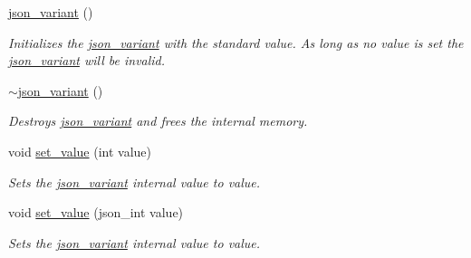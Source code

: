 \begin{DoxyCompactItemize}
\hyperlink{classJSONLIB__NAMESPACE_1_1json__variant_a846c20ca7916959fcf8768f6c5bac36d}{json\+\_\+variant} ()
\begin{DoxyCompactList}\small\item\em Initializes the \hyperlink{classJSONLIB__NAMESPACE_1_1json__variant}{json\+\_\+variant} with the standard value. As long as no value is set the \hyperlink{classJSONLIB__NAMESPACE_1_1json__variant}{json\+\_\+variant} will be invalid. \end{DoxyCompactList}\item 
\mbox{\label{classJSONLIB__NAMESPACE_1_1json__variant_acdc3fa9fc5613701852f467e695c7e10}} 
\hyperlink{classJSONLIB__NAMESPACE_1_1json__variant_acdc3fa9fc5613701852f467e695c7e10}{$\sim$json\+\_\+variant} ()
\begin{DoxyCompactList}\small\item\em Destroys \hyperlink{classJSONLIB__NAMESPACE_1_1json__variant}{json\+\_\+variant} and frees the internal memory. \end{DoxyCompactList}\item 
\mbox{\label{classJSONLIB__NAMESPACE_1_1json__variant_a0cfce194bda4d31ad37d765a6428974a}} 
void \hyperlink{classJSONLIB__NAMESPACE_1_1json__variant_a0cfce194bda4d31ad37d765a6428974a}{set\+\_\+value} (int value)
\begin{DoxyCompactList}\small\item\em Sets the \hyperlink{classJSONLIB__NAMESPACE_1_1json__variant}{json\+\_\+variant} internal value to {\ttfamily value}. \end{DoxyCompactList}\item 
\mbox{\label{classJSONLIB__NAMESPACE_1_1json__variant_abb7433858e7a623644db82569bca8b40}} 
void \hyperlink{classJSONLIB__NAMESPACE_1_1json__variant_abb7433858e7a623644db82569bca8b40}{set\+\_\+value} (json\+\_\+int value)
\begin{DoxyCompactList}\small\item\em Sets the \hyperlink{classJSONLIB__NAMESPACE_1_1json__variant}{json\+\_\+variant} internal value to {\ttfamily value}. \end{DoxyCompactList}\item 
\mbox{\label{classJSONLIB__NAMESPACE_1_1json__variant_af2057f124cfd8c6ae3239a99d170e058}} 

\end{DoxyCompactItemize}
